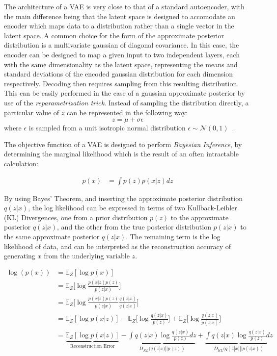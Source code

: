 \documentclass[12pt, a4paper]{article}
\begin{document}
The architecture of a VAE is very close to that of a standard autoencoder, with the main difference
being that the latent space is designed to accomodate an encoder which maps data to a distribution 
rather than a single vector in the latent space. A common choice for the form of the approximate 
posterior distribution is a multivariate gaussian of diagonal covariance. In this case, the encoder can be designed to map a given input to two independent layers, each with the same 
dimensionality as the latent space, representing the means and standard deviations of the encoded gaussian distribution for each dimension respectively. 
Decoding then requires sampling from this resulting distribution. 
This can be easily performed in the case of a gaussian approximate posterior by use of the \textit{reparametrization trick}.
Instead of sampling the distribution directly, a particular value of $z$ can be represented in the following way:
\[z=\mu + \sigma \epsilon\]
where $\epsilon$ is sampled from a unit isotropic normal distribution $\epsilon \sim \mathcal{N}(0, 1)$~\cite{kingma2014autoencoding}.


The objective function of a VAE is designed to perform \textit{Bayesian Inference}, by determining the marginal likelihood which is the result of an often intractable calculation:

\begin{align*}
p(x) &= \int p(z)p(x|z)dz
\end{align*}

By using Bayes' Theorem, and inserting the approximate posterior distribution $q(z|x)$, the log likelihood can be expressed in terms of two Kullback-Leibler (KL) Divergences, one from a prior distribution $p(z)$ to the approximate posterior $q(z|x)$, and the other from the true posterior distribution $p(z|x)$ to the same approximate posterior $q(z|x)$. The remaining term is the log likelihood of data, and can be interpreted as the reconstruction accuracy of generating $x$ from the underlying variable $z$. 

\begin{align*}
\log(p(x))  &= \mathbb{E}_Z[\log p(x)] \\
  &= \mathbb{E}_Z\bigg[\log \frac{p(x|z)p(z)}{p(z|x)}\bigg] \\
  &= \mathbb{E}_Z\bigg[\log \frac{p(x|z)p(z)}{p(z|x)} \frac{q(z|x)}{q(z|x)}\bigg] \\
  &= \mathbb{E}_Z[\log p(x|z)] - \mathbb{E}_Z\bigg[\log \frac{q(z|x)}{p(z)}\bigg] + \mathbb{E}_Z\bigg[\log \frac{q(z|x)}{p(z|x)}\bigg] \\
  &= \underbrace{\mathbb{E}_Z[\log p(x|z)]}_\text{Reconstruction Error} - \underbrace{\int q(z|x)\log \frac{q(z|x)}{p(z)}dz}_{D_{KL}(q(z|x)||p(z))} + \underbrace{\int q(z|x)\log \frac{q(z|x)}{p(z)}dz}_{D_{KL}(q(z|x)||p(z|x))}
\end{align*} 
\end{document}
